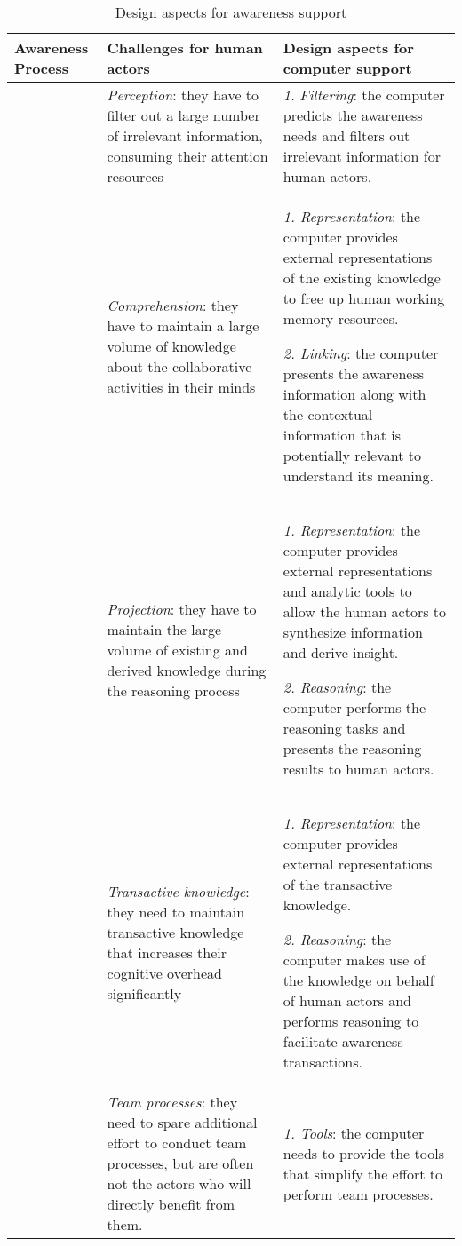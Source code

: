 \begin{table}[htbp]
\centering
\footnotesize
\begin{tabular}{>{\raggedright}p{1.2in}>{\raggedright}p{2.2in}>{\raggedright}p{2.2in}}
\toprule 
\textbf{Awareness Process} & \textbf{Challenges for human actors} & \textbf{Design aspects for computer support}\tabularnewline
\midrule 
\multirow{3}{1.2in}{Development of individual awareness} & \emph{Perception}: they have to filter out a large number of irrelevant
information, consuming their attention resources & \emph{1.} \emph{Filtering}: the computer predicts the awareness needs
and filters out irrelevant information for human actors.\tabularnewline
\cmidrule{2-3} 
 & \emph{Comprehension}: they have to maintain a large volume of knowledge
about the collaborative activities in their minds & \emph{1. Representation}: the computer provides external representations
of the existing knowledge to free up human working memory resources.

\emph{2. Linking}: the computer presents the awareness information
along with the contextual information that is potentially relevant
to understand its meaning.\tabularnewline
\cmidrule{2-3} 
 & \emph{Projection}: they have to maintain the large volume of existing
and derived knowledge during the reasoning process  & \emph{1. Representation}: the computer provides external representations
and analytic tools to allow the human actors to synthesize information
and derive insight.

\emph{2. Reasoning}: the computer performs the reasoning tasks and
presents the reasoning results to human actors.\tabularnewline
\midrule 
\multirow{3}{1.2in}{Development of collaborative awareness} & \emph{Transactive knowledge}: they need to maintain transactive knowledge
that increases their cognitive overhead significantly & \emph{1. Representation}: the computer provides external representations
of the transactive knowledge.

\emph{2. Reasoning}: the computer makes use of the knowledge on behalf
of human actors and performs reasoning to facilitate awareness transactions.\tabularnewline
\cmidrule{2-3} 
 & \emph{Team processes}: they need to spare additional effort to conduct
team processes, but are often not the actors who will directly benefit
from them. & \emph{1. Tools}: the computer needs to provide the tools that simplify
the effort to perform team processes.\tabularnewline
\bottomrule
\end{tabular}  
\caption{Design aspects for awareness support}
\label{tab:design_aspects}
\end{table}

